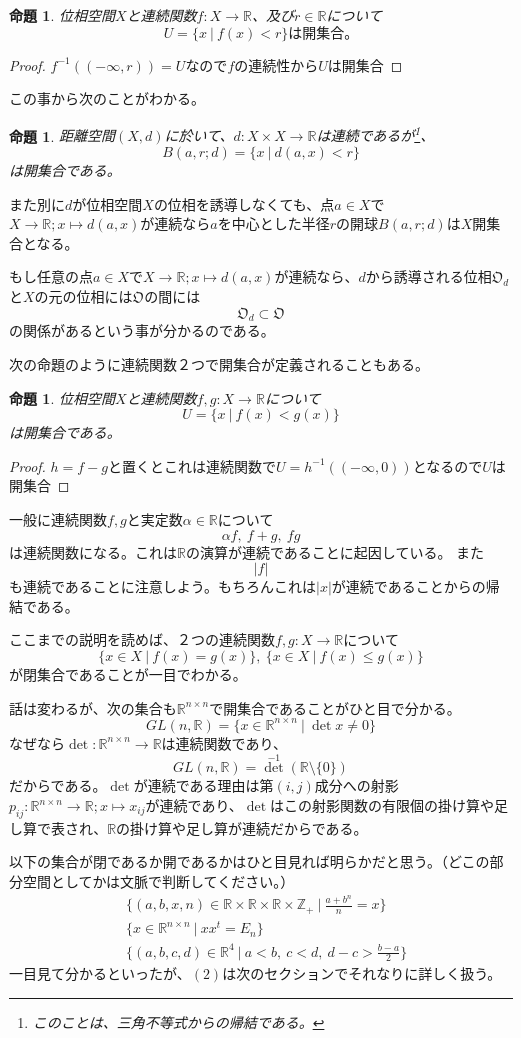 \documentclass[leqno]{jsarticle}
\newtheorem{prop}[thm]{命題}
\newcommand{\zz}{\mathbb{Z}}
\newcommand{\rr}{\mathbb{R}}
\newcommand{\mgn}{\infty}
\newcommand{\al}{\alpha}
\begin{document}
\begin{prop}
位相空間$X$と連続関数$f:X\to \rr$、及び$r\in \rr$について
\[
U=\{x \ | \ f(x)<r\}は開集合。
\]
\end{prop}
\begin{proof}
$f^{-1}((-\mgn,r))=U$なので$f$の連続性から$U$は開集合
\end{proof}
この事から次のことがわかる。
\begin{prop}
距離空間$(X,d)$に於いて、$d:X\times X\to \rr$は連続であるが\footnote{このことは、三角不等式からの帰結である。}、
\[
B(a,r;d)=\{x\ |\ d(a,x)<r\}
\]
は開集合である。
\end{prop}
また別に$d$が位相空間$X$の位相を誘導しなくても、点$a\in X$で$X\to \rr;x\mapsto d(a,x)$が連続なら$a$を中心とした半径$r$の開球$B(a,r;d)$は$X$開集合となる。\par
もし任意の点$a\in X$で$X\to \rr;x\mapsto d(a,x)$が連続なら、$d$から誘導される位相$\mathfrak{O}_d$と$X$の元の位相には$\mathfrak{O}$の間には
\[
\mathfrak{O}_d\subset \mathfrak{O}
\]
の関係があるという事が分かるのである。\par
次の命題のように連続関数２つで開集合が定義されることもある。
\begin{prop}
位相空間$X$と連続関数$f,g:X\to \rr$について
\[
U=\{x\ |\ f(x)<g(x)\}
\]
は開集合である。
\end{prop}
\begin{proof}
$h=f-g$と置くとこれは連続関数で$U=h^{-1}((-\mgn,0))$となるので$U$は開集合
\end{proof}
一般に連続関数$f,g$と実定数$\al\in \rr$について
\[
\al f,\ f+g,\ fg
\]
は連続関数になる。これは$\rr$の演算が連続であることに起因している。
また
\[
|f|
\]
も連続であることに注意しよう。もちろんこれは$|x|$が連続であることからの帰結である。\par
ここまでの説明を読めば、２つの連続関数$f,g:X\to \rr$について
\[
\{x\in X\ |\ f(x)=g(x)\},\ \{x\in X\ |\ f(x)\le g(x)\}
\]
が閉集合であることが一目でわかる。\par
話は変わるが、次の集合も$\rr^{n\times n}$で開集合であることがひと目で分かる。
\[
GL(n,\rr)=\{x\in \rr^{n\times n}\ |\ \det x\neq 0\}
\]
なぜなら$\det:\rr^{n\times n}\to \rr$は連続関数であり、
\[
GL(n,\rr)=\det^{-1}(\rr\setminus \{0\})
\]
だからである。$\det$が連続である理由は第$(i,j)$成分への射影$p_{ij}:\rr^{n\times n}\to \rr;x\mapsto x_{ij}$が連続であり、$\det$はこの射影関数の有限個の掛け算や足し算で表され、$\rr$の掛け算や足し算が連続だからである。\par
以下の集合が閉であるか開であるかはひと目見れば明らかだと思う。（どこの部分空間としてかは文脈で判断してください。）
\begin{align}
&\{(a,b,x,n)\in \rr\times \rr\times \rr\times \zz_{+}\ |\ \frac{a+b^n}{n}=x\}\\ 
&\{x\in \rr^{n\times n}\ |\ xx^{t}=E_n\}\\
&\{(a,b,c,d)\in \rr^{4}\ |\ a<b,\ c<d,\ d-c>\frac{b-a}{2}\}
\end{align}
一目見て分かるといったが、$(2)$は次のセクションでそれなりに詳しく扱う。
\end{document}
